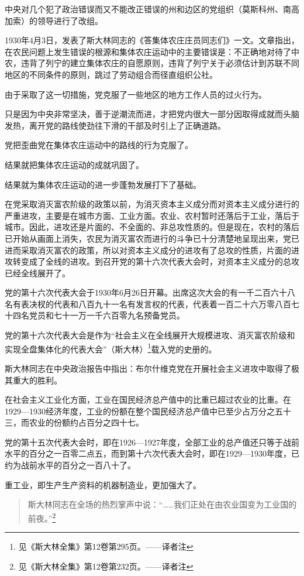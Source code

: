 中央对几个犯了政治错误而又不能改正错误的州和边区的党组织（莫斯科州、南高加索）的领导进行了改组。

1930年4月3日，发表了斯大林同志的《答集体农庄庄员同志们》一文。文章指出，在农民问题上发生错误的根源和集体农庄运动中的主要错误是：不正确地对待了中农，违背了列宁的建立集体农庄的自愿原则，违背了列宁关于必须估计到苏联不同地区的不同条件的原则，跳过了劳动组合而径直组织公社。

由于采取了这一切措施，党克服了一些地区的地方工作人员的过火行为。

只是因为中央非常坚决，善于逆潮流而进，才把党内很大一部分因取得成就而头脑发热，离开党的路线使劲往下滑的干部及时引上了正确道路。

党把歪曲党在集体农庄运动中的路线的行为克服了。

结果就把集体农庄运动的成就巩固了。

结果就为集体农庄运动的进一步蓬勃发展打下了基础。

在党采取消灭富农阶级的政策以前，为消灭资本主义成分而对资本主义成分进行的严重进攻，主要是在城市方面、工业方面。农业、农村暂时还落后于工业，落后于城市。因此，进攻还是片面的、不全面的、非总攻性质的。但是现在，农村的落后已开始从画面上消失，农民为消灭富农而进行的斗争已十分清楚地呈现出来，党已进而采取消灭富农的政策，所以对资本主义成分的进攻有了总攻的性质，片面的进攻转变成了全线的进攻。到召开党的第十六次代表大会时，对资本主义成分的总攻已经全线展开了。

党的第十六次代表大会于1930年6月26日开幕。出席这次大会的有一千二百六十八名有表决杈的代表和八百九十一名有发言权的代表，代表着一百二十六万零八百七十四名党员和七十一万一千六百零九名预备党员。

党的第十六次代表大会是作为“社会主义在全线展开大规模进攻、消灭富农阶级和实现全盘集体化的代表大会”（斯大林）\footnote{见《斯大林全集》第12卷第295页。——译者注}载入党的史册的。

斯大林同志在中央政治报告中指出：布尔什维克党在开展社会主义进攻中取得了极其重大的胜利。

在社会主义工业化方面，工业在国民经济总产值中的比重已超过农业的比重。在1929—1930经济年度，工业的份额在整个国民经济总产值中已至少占万分之五十三，而农业的份额约占百分之四十七。

党的第十五次代表大会时，即在1926—1927年度，全部工业的总产值还只等于战前水平的百分之一百零二点五，而到第十六次代表大会时，即在1929—1930年度，已约为战前水平的百分之一百八十了。

重工业，即生产生产资料的机器制造业，更加强大了。

\begin{quotation}
斯大林同志在全场的热烈掌声中说：“……我们正处在由农业国变为工业国的前夜。”\footnote{见《斯大林全集》第12卷第232页。——译者注}
\end{quotation}

